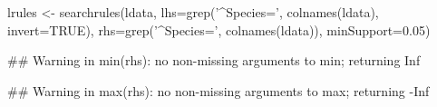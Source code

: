\begin{Schunk}
% --begin: "casestudy-assoc-searchrules"
\begin{Sinput}
lrules <- searchrules(ldata,
                      lhs=grep('^Species=', colnames(ldata), invert=TRUE),
                      rhs=grep('^Species=', colnames(ldata)),
                      minSupport=0.05)
\end{Sinput}
\begin{Soutput}
## Warning in min(rhs): no non-missing arguments to min; returning Inf
\end{Soutput}
\begin{Soutput}
## Warning in max(rhs): no non-missing arguments to max; returning -Inf
\end{Soutput}
%
% --end: "casestudy-assoc-searchrules"
\end{Schunk}
